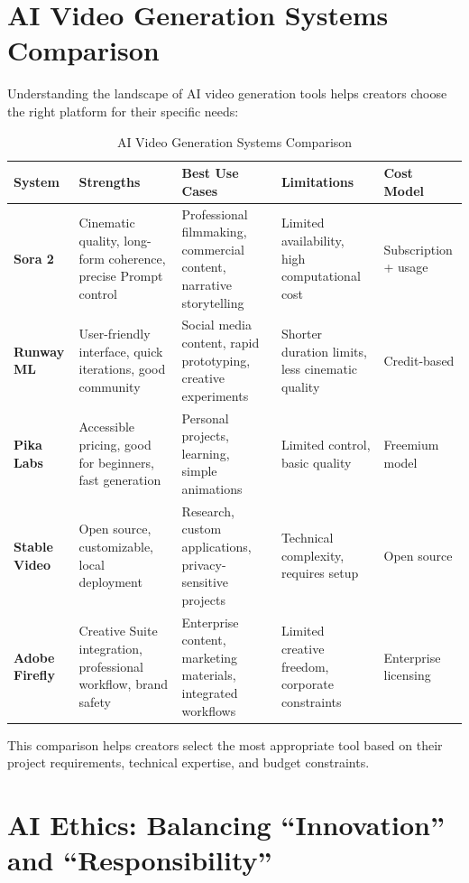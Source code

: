 \section{AI Video Generation Systems Comparison}
\label{sec:ai-systems-comparison}

Understanding the landscape of AI video generation tools helps creators choose the right platform for their specific needs:

\begin{table}[H]
\centering
\caption{AI Video Generation Systems Comparison \\ \authorillustration}
\label{tab:ai-systems-comparison}
\begin{tabular}{|p{2.5cm}|p{2.5cm}|p{2.5cm}|p{2.5cm}|p{2.5cm}|}
\hline
\textbf{System} & \textbf{Strengths} & \textbf{Best Use Cases} & \textbf{Limitations} & \textbf{Cost Model} \\
\hline
\textbf{Sora 2} & Cinematic quality, long-form coherence, precise Prompt control & Professional filmmaking, commercial content, narrative storytelling & Limited availability, high computational cost & Subscription + usage \\
\hline
\textbf{Runway ML} & User-friendly interface, quick iterations, good community & Social media content, rapid prototyping, creative experiments & Shorter duration limits, less cinematic quality & Credit-based \\
\hline
\textbf{Pika Labs} & Accessible pricing, good for beginners, fast generation & Personal projects, learning, simple animations & Limited control, basic quality & Freemium model \\
\hline
\textbf{Stable Video} & Open source, customizable, local deployment & Research, custom applications, privacy-sensitive projects & Technical complexity, requires setup & Open source \\
\hline
\textbf{Adobe Firefly} & Creative Suite integration, professional workflow, brand safety & Enterprise content, marketing materials, integrated workflows & Limited creative freedom, corporate constraints & Enterprise licensing \\
\hline
\end{tabular}
\end{table}

This comparison helps creators select the most appropriate tool based on their project requirements, technical expertise, and budget constraints.

\section{AI Ethics: Balancing ``Innovation'' and ``Responsibility''}
\label{sec:ai-ethics}

